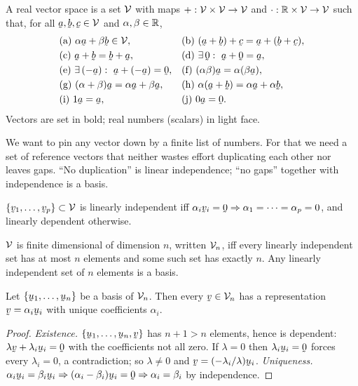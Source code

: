 \begin{definition}\label{def:vs}
A real vector space is a set $\mathcal{V}$ with maps $+:\mathcal{V}\times\mathcal{V}\to\mathcal{V}$ and
$\cdot:\mathbb{R}\times\mathcal{V}\to\mathcal{V}$ such that, for all $\ba,\bb,\bc\in\V$ and
$\alpha,\beta\in\mathbb{R}$,
\[
\begin{array}{ll}
\text{(a)}\ \alpha\ba+\beta\bb\in\V, &
\text{(b)}\ (\ba+\bb)+\bc=\ba+(\bb+\bc), \\[1mm]
\text{(c)}\ \ba+\bb=\bb+\ba, &
\text{(d)}\ \exists\,\bze:\ \ba+\bze=\ba, \\[1mm]
\text{(e)}\ \exists\,(-\ba):\ \ba+(-\ba)=\bze, &
\text{(f)}\ (\alpha\beta)\ba=\alpha(\beta\ba), \\[1mm]
\text{(g)}\ (\alpha+\beta)\ba=\alpha\ba+\beta\ba, &
\text{(h)}\ \alpha(\ba+\bb)=\alpha\ba+\alpha\bb, \\[1mm]
\text{(i)}\ 1\ba=\ba, & \text{(j)}\ 0\ba=\bze.
\end{array}
\]
Vectors are set in bold; real numbers (scalars) in light face.
\end{definition}

We want to pin any vector down by a finite list of numbers. For that we
need a set of reference vectors that neither wastes effort duplicating each
other nor leaves gaps. ``No duplication'' is linear independence; ``no
gaps'' together with independence is a basis.

\begin{definition}\label{def:lindep}
$\{\bv_{1},\dots,\bv_{p}\}\subset\V$ is linearly independent iff
$\alpha_{i}\bv_{i}=\bze\Rightarrow\alpha_{1}=\cdots=\alpha_{p}=0$, and
linearly dependent otherwise.
\end{definition}

\begin{definition}\label{def:dim}
$\mathcal{V}$ is finite dimensional of dimension $n$, written $\mathcal{V}_{n}$, iff every
linearly independent set has at most $n$ elements and some such set has
exactly $n$. Any linearly independent set of $n$ elements is a basis.
\end{definition}

\begin{theorem}\label{thm:coord}
Let $\{\bu_{1},\dots,\bu_{n}\}$ be a basis of $\mathcal{V}_{n}$. Then every
$\bv\in\Vn$ has a representation $\bv=\alpha_{i}\bu_{i}$ with unique
coefficients $\alpha_{i}$.
\end{theorem}

\begin{proof}
\emph{Existence.} $\{\bu_{1},\dots,\bu_{n},\bv\}$ has $n+1>n$ elements,
hence is dependent: $\lambda\bv+\lambda_{i}\bu_{i}=\bze$ with the
coefficients not all zero. If $\lambda=0$ then $\lambda_{i}\bu_{i}=\bze$
forces every $\lambda_{i}=0$, a contradiction; so $\lambda\neq0$ and
$\bv=(-\lambda_{i}/\lambda)\bu_{i}$. \emph{Uniqueness.}
$\alpha_{i}\bu_{i}=\beta_{i}\bu_{i}\Rightarrow(\alpha_{i}-\beta_{i})\bu_{i}
=\bze\Rightarrow\alpha_{i}=\beta_{i}$ by independence.
\end{proof}

